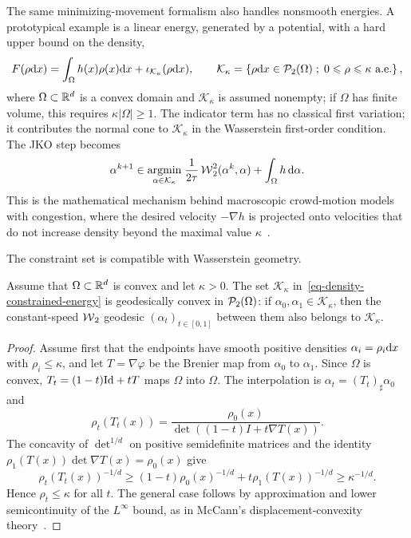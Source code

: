 The same minimizing-movement formalism also handles nonsmooth energies. A prototypical example is a linear energy, generated by a potential, with a hard upper bound on the density,
\begin{equation}\label{eq-density-constrained-energy}
	F(\rho\d x)=\int_\Omega h(x)\rho(x)\d x+
	\iota_{\mathcal K_\kappa}(\rho\d x),
	\qquad
	\mathcal K_\kappa=
	\enscond{\rho\d x\in\Pp_2(\Omega)}{0\leq\rho\leq\kappa\ \text{a.e.}},
\end{equation}
where $\Omega\subset\mathbb{R}^d$ is a convex domain and $\mathcal K_\kappa$ is assumed nonempty; if $\Omega$ has finite volume, this requires $\kappa|\Omega|\geq1$. The indicator term has no classical first variation; it contributes the normal cone to $\mathcal K_\kappa$ in the Wasserstein first-order condition. The JKO step becomes
\begin{equation}\label{eq-density-constrained-jko}
	\alpha^{k+1}
	\in
	\underset{\alpha\in\mathcal K_\kappa}{\operatorname{argmin}}\;
	\frac{1}{2\tau}\operatorname{\mathcal{W}}_2^2(\alpha^k,\alpha)+\int_\Omega h\,\mathrm{d}\alpha .
\end{equation}
This is the mathematical mechanism behind macroscopic crowd-motion models with congestion, where the desired velocity $-\nabla h$ is projected onto velocities that do not increase density beyond the maximal value $\kappa$~\cite{maury2010macroscopic,SantambrogioCrowdReview}.

The constraint set is compatible with Wasserstein geometry.

\begin{proposition}\label{prop-density-cap-geodesic-convex}
	Assume that $\Omega\subset\mathbb{R}^d$ is convex and let $\kappa>0$. The set $\mathcal K_\kappa$ in~\eqref{eq-density-constrained-energy} is geodesically convex in $\mathcal{P}_2(\Omega)$: if $\alpha_0,\alpha_1\in\mathcal K_\kappa$, then the constant-speed $\operatorname{\mathcal{W}}_2$ geodesic $(\alpha_t)_{t\in[0,1]}$ between them also belongs to $\mathcal K_\kappa$.
\end{proposition}
\begin{proof}
	Assume first that the endpoints have smooth positive densities $\alpha_i=\rho_i\mathrm{d} x$ with $\rho_i\leq\kappa$, and let $T=\nabla\varphi$ be the Brenier map from $\alpha_0$ to $\alpha_1$. Since $\Omega$ is convex, $T_t=(1-t)\mathrm{Id}+tT$ maps $\Omega$ into $\Omega$. The interpolation is $\alpha_t=(T_t)_\sharp\alpha_0$ and
	\[
		\rho_t(T_t(x))=\frac{\rho_0(x)}{\det((1-t)I+t\nabla T(x))}.
	\]
	The concavity of $\det^{1/d}$ on positive semidefinite matrices and the identity $\rho_1(T(x))\det\nabla T(x)=\rho_0(x)$ give
	\[
		\rho_t(T_t(x))^{-1/d}
		\geq
		(1-t)\rho_0(x)^{-1/d}+t\rho_1(T(x))^{-1/d}
		\geq\kappa^{-1/d}.
	\]
	Hence $\rho_t\leq\kappa$ for all $t$. The general case follows by approximation and lower semicontinuity of the $L^\infty$ bound, as in McCann's displacement-convexity theory~\cite{mccann1997convexity}.
\end{proof}

